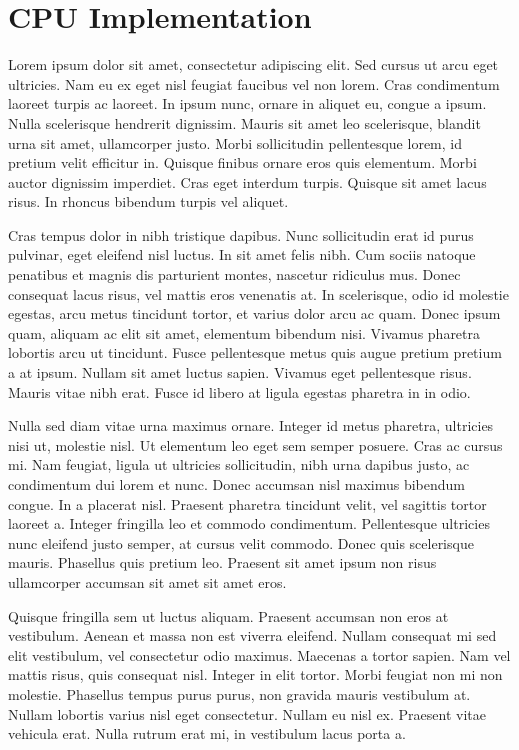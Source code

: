 \documentclass[a4paper,11pt]{kth-mag}
\begin{document}
\chapter{CPU Implementation}



Lorem ipsum dolor sit amet, consectetur adipiscing elit. Sed cursus ut arcu eget ultricies. Nam eu ex eget nisl feugiat faucibus vel non lorem. Cras condimentum laoreet turpis ac laoreet. In ipsum nunc, ornare in aliquet eu, congue a ipsum. Nulla scelerisque hendrerit dignissim. Mauris sit amet leo scelerisque, blandit urna sit amet, ullamcorper justo. Morbi sollicitudin pellentesque lorem, id pretium velit efficitur in. Quisque finibus ornare eros quis elementum. Morbi auctor dignissim imperdiet. Cras eget interdum turpis. Quisque sit amet lacus risus. In rhoncus bibendum turpis vel aliquet.

Cras tempus dolor in nibh tristique dapibus. Nunc sollicitudin erat id purus pulvinar, eget eleifend nisl luctus. In sit amet felis nibh. Cum sociis natoque penatibus et magnis dis parturient montes, nascetur ridiculus mus. Donec consequat lacus risus, vel mattis eros venenatis at. In scelerisque, odio id molestie egestas, arcu metus tincidunt tortor, et varius dolor arcu ac quam. Donec ipsum quam, aliquam ac elit sit amet, elementum bibendum nisi. Vivamus pharetra lobortis arcu ut tincidunt. Fusce pellentesque metus quis augue pretium pretium a at ipsum. Nullam sit amet luctus sapien. Vivamus eget pellentesque risus. Mauris vitae nibh erat. Fusce id libero at ligula egestas pharetra in in odio.

Nulla sed diam vitae urna maximus ornare. Integer id metus pharetra, ultricies nisi ut, molestie nisl. Ut elementum leo eget sem semper posuere. Cras ac cursus mi. Nam feugiat, ligula ut ultricies sollicitudin, nibh urna dapibus justo, ac condimentum dui lorem et nunc. Donec accumsan nisl maximus bibendum congue. In a placerat nisl. Praesent pharetra tincidunt velit, vel sagittis tortor laoreet a. Integer fringilla leo et commodo condimentum. Pellentesque ultricies nunc eleifend justo semper, at cursus velit commodo. Donec quis scelerisque mauris. Phasellus quis pretium leo. Praesent sit amet ipsum non risus ullamcorper accumsan sit amet sit amet eros.

Quisque fringilla sem ut luctus aliquam. Praesent accumsan non eros at vestibulum. Aenean et massa non est viverra eleifend. Nullam consequat mi sed elit vestibulum, vel consectetur odio maximus. Maecenas a tortor sapien. Nam vel mattis risus, quis consequat nisl. Integer in elit tortor. Morbi feugiat non mi non molestie. Phasellus tempus purus purus, non gravida mauris vestibulum at. Nullam lobortis varius nisl eget consectetur. Nullam eu nisl ex. Praesent vitae vehicula erat. Nulla rutrum erat mi, in vestibulum lacus porta a.
\end{document}
